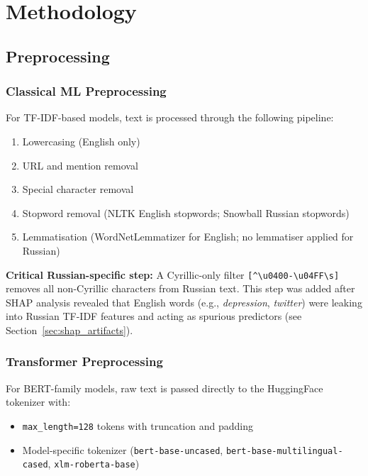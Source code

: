 \documentclass[12pt, a4paper, oneside]{report}
\begin{document}
\chapter{Methodology}
\label{ch:method}

\section{Preprocessing}

\subsection{Classical ML Preprocessing}

For TF-IDF-based models, text is processed through the following pipeline:
\begin{enumerate}
    \item Lowercasing (English only)
    \item URL and mention removal
    \item Special character removal
    \item Stopword removal (NLTK English stopwords; Snowball Russian stopwords)
    \item Lemmatisation (WordNetLemmatizer for English; no lemmatiser applied for Russian)
\end{enumerate}

\textbf{Critical Russian-specific step:} A Cyrillic-only filter \texttt{[\^{}\textbackslash u0400-\textbackslash u04FF\textbackslash s]} removes all non-Cyrillic characters from Russian text. This step was added after SHAP analysis revealed that English words (e.g., \textit{depression}, \textit{twitter}) were leaking into Russian TF-IDF features and acting as spurious predictors (see Section~\ref{sec:shap_artifacts}).

\subsection{Transformer Preprocessing}

For BERT-family models, raw text is passed directly to the HuggingFace tokenizer with:
\begin{itemize}
    \item \texttt{max\_length=128} tokens with truncation and padding
    \item Model-specific tokenizer (\texttt{bert-base-uncased}, \texttt{bert-base-multilingual-cased}, \texttt{xlm-roberta-base})
\end{itemize}
\end{document}
